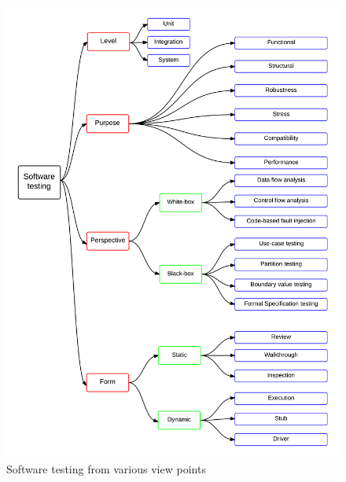 \begin{figure}[H]
	\centering
	\centerline{\includegraphics[width=\textwidth]{chapter2/softwareTestingFlow.png}}
	\caption{Software testing from various view points}
	\label{fig:softwareTestingFlow_2}
\end{figure}




